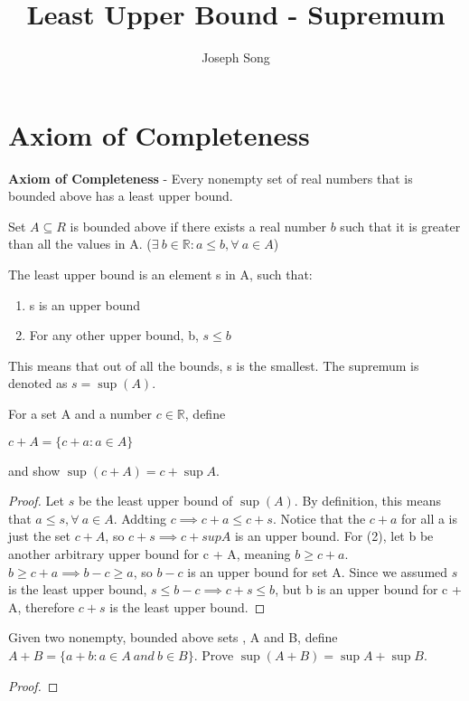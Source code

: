 \documentclass{article}
\title{Least Upper Bound - Supremum}
\author{Joseph Song}
\date{}
\begin{document}
\maketitle

\section{Axiom of Completeness}
\textbf{Axiom of Completeness} - Every nonempty set of real numbers that is bounded above has a least upper bound.
\begin{definition}
    Set $A \subseteq R$ is bounded above if there exists a real number $b$ such that it is greater than all the values in A. ($\exists\ b \in \mathbb{R}: a \leq b, \forall\ a\in A$)
\end{definition}

\begin{definition}
    The least upper bound is an element s in A, such that:
    \begin{enumerate}
        \item s is an upper bound
        \item For any other upper bound, b, $s \leq b$
    \end{enumerate}
    This means that out of all the bounds, s is the smallest. The supremum is denoted as $s = \operatorname{sup}(A)$.
\end{definition}

\begin{example}
    For a set A and a number $c \in \mathbb{R}$, define
    \begin{center}
        $c + A = \{c + a : a \in A\}$
    \end{center}
    and show $\operatorname{sup}(c+A) = c+\operatorname{sup}A$.
\end{example}
\begin{proof}

    Let $s$ be the least upper bound of $\operatorname{sup}(A)$. By definition, this means that $a \leq s, \forall\ a \in A$. Addting $c \implies c +a \leq c + s$. Notice that the $c + a$ for all a is just the set $c + A$, so $c + s \implies c+ supA$ is an upper bound. For (2), let b be another arbitrary upper bound for c + A, meaning $b \geq c + a$. $b \geq c + a \implies b - c \geq a$, so $b - c$ is an upper bound for set A. Since we assumed $s$ is the least upper bound, $s \leq b - c \implies c + s \leq b$, but b is an upper bound for c + A, therefore $c + s$ is the least upper bound.
    
\end{proof}

\begin{example}
    Given two nonempty, bounded above sets , A and B, define $A + B = \{a + b : a \in A\ and\ b\in B\}$. Prove $\operatorname{sup}(A+B) = \operatorname{sup}A + \operatorname{sup}B$.
\end{example}
\begin{proof}
    
\end{proof}
\end{document}
